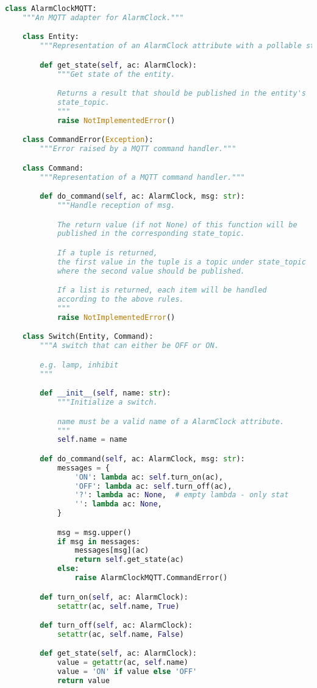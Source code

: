 \begin{lstlisting}[language=Python]
class AlarmClockMQTT:
    """An MQTT adapter for AlarmClock."""

    class Entity:
        """Representation of an AlarmClock attribute with a pollable state."""

        def get_state(self, ac: AlarmClock):
            """Get state of the entity.

            Returns a result that should be published in the entity's
            state_topic.
            """
            raise NotImplementedError()

    class CommandError(Exception):
        """Error raised by a MQTT command handler."""

    class Command:
        """Representation of a MQTT command handler."""

        def do_command(self, ac: AlarmClock, msg: str):
            """Handle reception of msg.

            The return value (if not None) of this function will be
            published in the corresponding state_topic.

            If a tuple is returned,
            the first value in the tuple is a topic under state_topic
            where the second value should be published.

            If a list is returned, each item will be handled
            according to the above rules.
            """
            raise NotImplementedError()

    class Switch(Entity, Command):
        """A switch that can either be OFF or ON.

        e.g. lamp, inhibit
        """

        def __init__(self, name: str):
            """Initialize a switch.

            name must be a valid name of a AlarmClock attribute.
            """
            self.name = name

        def do_command(self, ac: AlarmClock, msg: str):
            messages = {
                'ON': lambda ac: self.turn_on(ac),
                'OFF': lambda ac: self.turn_off(ac),
                '?': lambda ac: None,  # empty lambda - only stat
                '': lambda ac: None,
            }

            msg = msg.upper()
            if msg in messages:
                messages[msg](ac)
                return self.get_state(ac)
            else:
                raise AlarmClockMQTT.CommandError()

        def turn_on(self, ac: AlarmClock):
            setattr(ac, self.name, True)

        def turn_off(self, ac: AlarmClock):
            setattr(ac, self.name, False)

        def get_state(self, ac: AlarmClock):
            value = getattr(ac, self.name)
            value = 'ON' if value else 'OFF'
            return value
\end{lstlisting}

